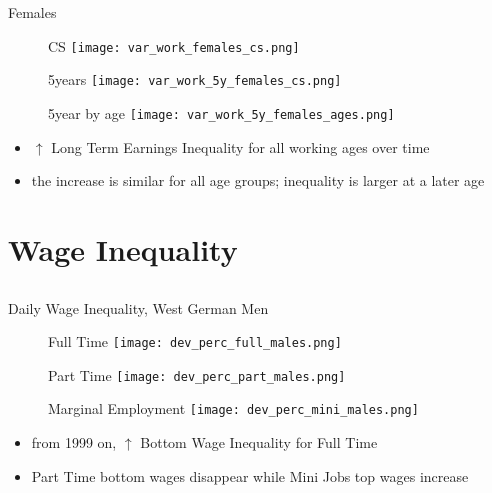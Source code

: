 \documentclass[hyperref={bookmarks=false}]{beamer}
\let\oldcite=\cite
\renewcommand{\cite}[1]{\textcolor[rgb]{.0,.2,.7}{\oldcite{#1}}}
\begin{document}
\begin{appendix}
\begin{frame}{Females}
\begin{figure}[!t]
	\centering
	\begin{minipage}[b]{0.3\textwidth}{CS}
		\centering
		\texttt{[image: var\_work\_females\_cs.png]}
	\end{minipage}
	\begin{minipage}[b]{0.3\textwidth}{5years}
		\centering
		\texttt{[image: var\_work\_5y\_females\_cs.png]}
	\end{minipage}
	\begin{minipage}[b]{0.3\textwidth}{5year by age}
		\centering
		\texttt{[image: var\_work\_5y\_females\_ages.png]}
	\end{minipage}
\end{figure}
\begin{itemize}
	\setlength{\itemsep}{0.7 cm}
	\item $\uparrow$ Long Term Earnings Inequality for all working ages over time \cite{BoCo15}
	\item the increase is similar for all age groups; inequality is larger at a later age
\end{itemize}
\end{frame}



\section{Wage Inequality}
\subsection{}

\begin{frame}
\label{WINEQ}
\end{frame}

\begin{frame}{Daily Wage Inequality, West German Men}
\begin{figure}[!t]
\centering
\begin{minipage}[b]{0.32\textwidth}{Full Time}
\centering
\texttt{[image: dev\_perc\_full\_males.png]}
\end{minipage}
\begin{minipage}[b]{0.32\textwidth}{Part Time}
\centering
\texttt{[image: dev\_perc\_part\_males.png]}
\end{minipage}
\begin{minipage}[b]{0.32\textwidth}{Marginal Employment}
\centering
\texttt{[image: dev\_perc\_mini\_males.png]}
\end{minipage}
\end{figure}
\begin{itemize}
\setlength{\itemsep}{0.7 cm}
\item from 1999 on, $\uparrow$ Bottom Wage Inequality for Full Time
\item  Part Time bottom wages disappear while Mini Jobs top wages increase
\end{itemize}
\end{frame}


\end{appendix}
\end{document}
